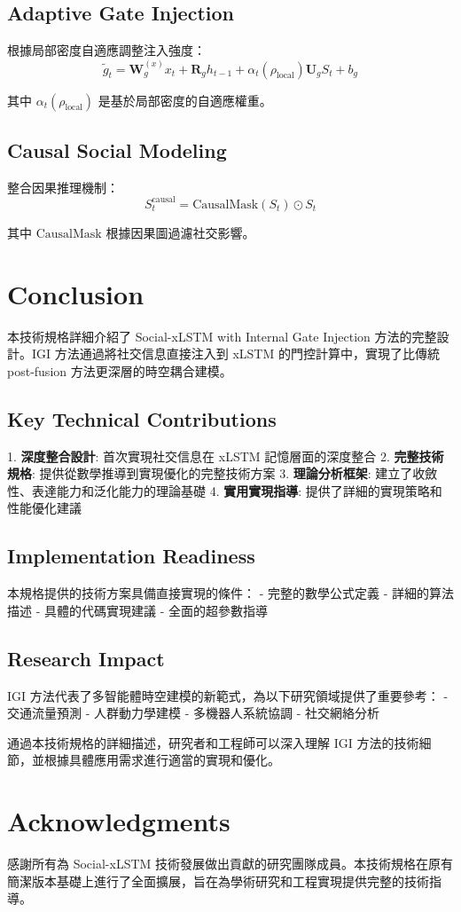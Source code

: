 \documentclass[11pt,a4paper]{article}
\begin{document}
\subsection{Adaptive Gate Injection}

根據局部密度自適應調整注入強度：
\begin{equation}
\tilde{g}_t = \mathbf{W}_g^{(x)} x_t + \mathbf{R}_g h_{t-1} + \alpha_t(\rho_{\text{local}}) \mathbf{U}_g S_t + b_g
\end{equation}

其中 $\alpha_t(\rho_{\text{local}})$ 是基於局部密度的自適應權重。

\subsection{Causal Social Modeling}

整合因果推理機制：
\begin{equation}
S_t^{\text{causal}} = \text{CausalMask}(S_t) \odot S_t
\end{equation}

其中 $\text{CausalMask}$ 根據因果圖過濾社交影響。

\section{Conclusion}

本技術規格詳細介紹了 Social-xLSTM with Internal Gate Injection 方法的完整設計。IGI 方法通過將社交信息直接注入到 xLSTM 的門控計算中，實現了比傳統 post-fusion 方法更深層的時空耦合建模。

\subsection{Key Technical Contributions}

1. \textbf{深度整合設計}: 首次實現社交信息在 xLSTM 記憶層面的深度整合
2. \textbf{完整技術規格}: 提供從數學推導到實現優化的完整技術方案
3. \textbf{理論分析框架}: 建立了收斂性、表達能力和泛化能力的理論基礎
4. \textbf{實用實現指導}: 提供了詳細的實現策略和性能優化建議

\subsection{Implementation Readiness}

本規格提供的技術方案具備直接實現的條件：
- 完整的數學公式定義
- 詳細的算法描述
- 具體的代碼實現建議
- 全面的超參數指導

\subsection{Research Impact}

IGI 方法代表了多智能體時空建模的新範式，為以下研究領域提供了重要參考：
- 交通流量預測
- 人群動力學建模
- 多機器人系統協調
- 社交網絡分析

通過本技術規格的詳細描述，研究者和工程師可以深入理解 IGI 方法的技術細節，並根據具體應用需求進行適當的實現和優化。

\section*{Acknowledgments}

感謝所有為 Social-xLSTM 技術發展做出貢獻的研究團隊成員。本技術規格在原有簡潔版本基礎上進行了全面擴展，旨在為學術研究和工程實現提供完整的技術指導。
\end{document}
